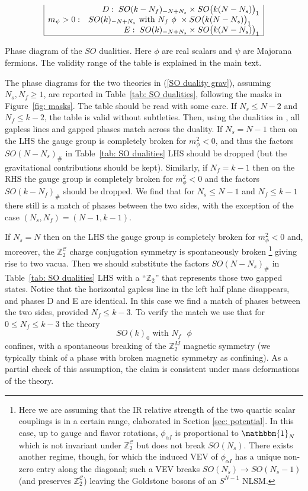 \documentclass[a4paper, 12pt]{article}
\numberwithin{equation}{section}
\newcommand{\be}{\begin{equation}} \newcommand{\ee}{\end{equation}}
\newcommand{\cC}{\mathcal{C}}
\newcommand{\bZ}{\mathbb{Z}}
\newcommand{\unit}{\mathbbm{1}}
\begin{document}
\begin{table}[t!]
{$$\begin{array}{|lll|}
	& \multicolumn{2}{r|}{D:\; SO(k-N_f)_{-N + N_s} \times SO\big( k(N-N_s) \big)_1} \\
m_\psi>0: &	SO(k)_{-N+N_s} \text{ with $N_f$ $\phi$ } \times SO\big( k(N-N_s) \big)_1 & \\
	& \multicolumn{2}{r|}{E:\; SO(k)_{-N+N_s} \times SO\big( k(N-N_s)\big)_1} \\
\hline
\end{array}
$$
}
\caption{Phase diagram of the $SO$ dualities. Here $\phi$ are real scalars and $\psi$ are Majorana fermions. The validity range of the table is explained in the main text.
\label{tab: SO dualities}}
\end{table}


The phase diagrams for the two theories in (\ref{SO duality grav}), assuming $N_s, N_f \geq 1$, are reported in Table~\ref{tab: SO dualities}, following the masks in Figure~\ref{fig: masks}. The table should be read with some care. If $N_s \leq N-2$ and $N_f \leq k-2$, the table is valid without subtleties. Then, using the dualities in \cite{Aharony:2016jvv}, all gapless lines and gapped phases match across the duality. If $N_s = N-1$ then on the LHS the gauge group is completely broken for $m_\phi^2<0$, and thus the factors $SO(N-N_s)_\#$ in Table~\ref{tab: SO dualities} LHS should be dropped (but the gravitational contributions should be kept). Similarly, if $N_f = k-1$ then on the RHS the gauge group is completely broken for $m_\phi^2<0$ and the factors $SO(k-N_f)_\#$ should be dropped. We find that for $N_s \leq N-1$ and $N_f \leq k-1$ there still is a match of phases between the two sides, with the exception of the case $(N_s, N_f) = (N-1,k-1)$.

If $N_s = N$ then on the LHS the gauge group is completely broken for $m_\phi^2<0$ and, moreover, the $\bZ_2^\cC$ charge conjugation symmetry is spontaneously broken%
\footnote{Here we are assuming that the IR relative strength of the two quartic scalar couplings is in a certain range, elaborated in Section \ref{sec: potential}. In this case, up to gauge and flavor rotations, $\phi_{\alpha I}$ is proportional to $\unit_N$ which is not invariant under $\bZ_2^\cC$ but does not break $SO(N_s)$. There exists another regime, though, for which the induced VEV of $\phi_{\alpha I}$ has a unique non-zero entry along the diagonal; such a VEV breaks $SO(N_s) \to SO(N_s-1)$ (and preserves $\bZ_2^\cC$) leaving the Goldstone bosons of an $S^{N-1}$ NLSM.}
giving rise to two vacua. Then we should substitute the factors $SO(N-N_s)_\#$ in Table~\ref{tab: SO dualities} LHS with a ``$\bZ_2$'' that represents those two gapped states. Notice that the horizontal gapless line in the left half plane disappears, and phases D and E are identical. In this case we find a match of phases between the two sides, provided $N_f \leq k-3$. To verify the match we use that for $0 \leq N_f \leq k-3$ the theory
\be
\label{SO confinement}
SO(k)_0 \text{ with $N_f$ $\phi$}
\ee
confines, with a spontaneous breaking of the $\bZ_2^M$ magnetic symmetry (we typically think of a phase with broken magnetic symmetry as confining). As a partial check of this assumption, the claim is consistent under mass deformations of the theory.
\end{document}
